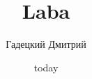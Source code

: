 \documentclass[a4paper,12pt]{article}
\title{Laba}
\author{Гадецкий Дмитрий}
\date{today}
\begin{document}

\renewcommand{\baselinestretch}{1.3}
%
%

%




%
%
\end{document}
